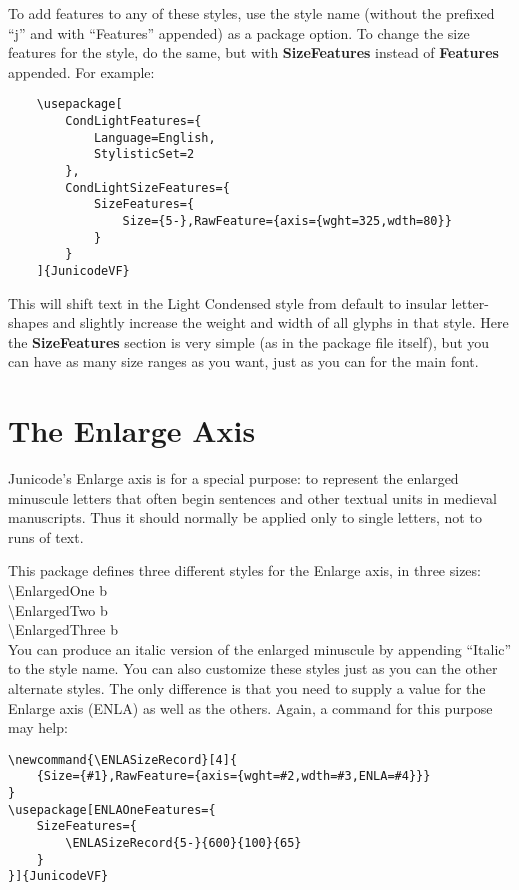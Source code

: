 \documentclass[12pt]{article}
\begin{document}
To add features to any of these styles, use the style name
(without the prefixed “j” and with “Features” appended)
as a package option. To change the size features for the style,
do the same, but with \textbf{SizeFeatures} instead of \textbf{Features}
appended. For example:

\footnotesize
\begin{verbatim}
    \usepackage[
        CondLightFeatures={
            Language=English,
            StylisticSet=2
        },
        CondLightSizeFeatures={
            SizeFeatures={
                Size={5-},RawFeature={axis={wght=325,wdth=80}}
            }
        }
    ]{JunicodeVF}
\end{verbatim}
\normalsize

\noindent This will shift text in the Light Condensed style from default to insular
letter-shapes and slightly increase the weight and width of all glyphs in that style.
Here the \textbf{SizeFeatures} section is very simple (as in the package file itself),
but you can have as many size ranges as you want, just as you can for the main font.

\section{The Enlarge Axis}

Junicode's Enlarge axis is for a special purpose: to represent the enlarged
minuscule letters that often begin sentences and other textual units in medieval manuscripts.
Thus it should normally be applied only to single letters, not to runs of text.

This package defines three different styles for the Enlarge axis, in three sizes:\\[0.5ex]

\noindent\textbackslash EnlargedOne {\EnlargedOne b}\\
\textbackslash EnlargedTwo {\EnlargedTwo b}\\
\textbackslash EnlargedThree {\EnlargedThree b}\\[0.5ex]

\noindent You can produce an italic version of the enlarged minuscule by appending “Italic” to
the style name. You can also customize these styles just as you can the other alternate
styles. The only difference is that you need to supply a value for the Enlarge axis (ENLA)
as well as the others. Again, a command for this purpose may help:

\footnotesize
\begin{verbatim}
\newcommand{\ENLASizeRecord}[4]{
    {Size={#1},RawFeature={axis={wght=#2,wdth=#3,ENLA=#4}}}
}
\usepackage[ENLAOneFeatures={
    SizeFeatures={
        \ENLASizeRecord{5-}{600}{100}{65}
    }
}]{JunicodeVF}
\end{verbatim}
\normalsize
\end{document}

